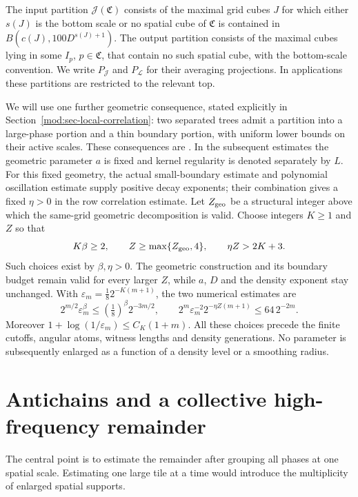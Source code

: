 \documentclass[11pt]{article}
\numberwithin{equation}{section}
\theoremstyle{remark}
\theoremstyle{definition}
\begin{document}
The input partition $\mathcal J(\mathfrak C)$ consists of the maximal
grid cubes $J$ for which either $s(J)$ is the bottom scale or no spatial
cube of $\mathfrak C$ is contained in
$B(c(J),100D^{s(J)+1})$. The output partition consists of the maximal
cubes lying in some $I_p$, $p\in\mathfrak C$, that contain no such spatial
cube, with the bottom-scale convention. We write $P_{\mathcal J}$ and
$P_{\mathcal L}$ for their averaging projections. In applications these
partitions are restricted to the relevant top.

We will use one further geometric consequence, stated explicitly in
Section~\ref{mod:sec-local-correlation}: two separated trees admit a
partition into a large-phase portion and a thin boundary portion, with
uniform lower bounds on their active scales. These consequences are
\cite[Lemmas 6.13--6.24]{BDJST}. In the subsequent estimates the geometric
parameter $a$ is fixed and kernel regularity is denoted separately by
$L$. For this fixed geometry, the actual small-boundary estimate and
polynomial oscillation estimate supply positive decay exponents; their
combination gives a fixed $\eta>0$ in the row correlation estimate.
Let $Z_{\rm geo}$ be a structural integer above which the same-grid
geometric decomposition is valid. Choose integers $K\ge1$ and $Z$ so that
\begin{equation}\label{mod:parameter-choice}
 K\beta\ge2,\qquad Z\ge\max\{Z_{\rm geo},4\},\qquad
 \eta Z>2K+3.
\end{equation}
Such choices exist by $\beta,\eta>0$. The geometric construction and
its boundary budget remain valid for every larger $Z$, while $a$, $D$
and the density exponent stay unchanged. With
$\varepsilon_m=\tfrac18 2^{-K(m+1)}$, the two numerical estimates are
\[
 2^{m/2}\varepsilon_m^\beta
 \le(\tfrac18)^\beta2^{-3m/2},\qquad
 2^m\varepsilon_m^{-2}2^{-\eta Z(m+1)}\le64\,2^{-2m}.
\]
Moreover $1+\log(1/\varepsilon_m)\le C_K(1+m)$.
All these choices precede the finite cutoffs, angular atoms, witness
lengths and density generations. No parameter is subsequently enlarged
as a function of a density level or a smoothing radius.



\section{Antichains and a collective high-frequency remainder}\label{mod:sec-antichains}
The central point is to estimate the remainder after grouping all phases
at one spatial scale. Estimating one large tile at a time would introduce
the multiplicity of enlarged spatial supports.
\end{document}

